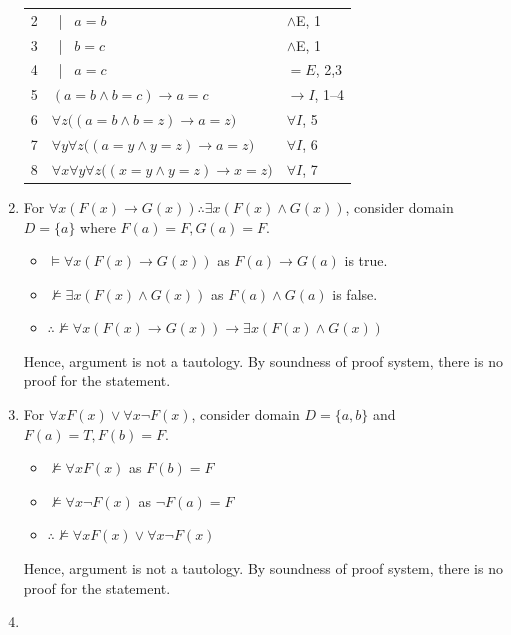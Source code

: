 \documentclass{article}
\newcommand{\asbar}{\ | \ }
\begin{document}
\begin{enumerate}
\begin{tabular}{l|p{8cm}l}
              2 & \asbar $a=b$                                                 & $\land$E, 1    \\
              3 & \asbar $b=c$                                                 & $\land$E, 1    \\
              4 & \asbar $a=c$                                                 & $=E$, 2,3      \\
              5 & $(a=b\land b=c)\to a=c$                                      & $\to I$, 1--4  \\
              6 & $\forall z\big((a=b\land b=z)\to a=z\big)$                   & $\forall I$, 5 \\
              7 & $\forall y\forall z\big((a=y\land y=z)\to a=z\big)$          & $\forall I$, 6 \\
              8 & $\forall x\forall y\forall z\big((x=y\land y=z)\to x=z\big)$ & $\forall I$, 7 \\
              \hline
          \end{tabular}
    \item For $\forall x\left(F(x)\to G(x)\right)\therefore \exists x\left(F(x)\land G(x)\right)$, consider domain $D=\{a\}$ where $F(a)=F, G(a)=F$.
          \begin{itemize}
              \item $\models \forall x\left(F(x)\to G(x)\right)$ as $F(a)\to G(a)$ is true.
              \item $\not\models \exists x\left(F(x)\land G(x)\right)$ as $F(a)\land G(a)$ is false.
              \item $\therefore \not\models \forall x\left(F(x)\to G(x)\right)\to \exists x\left(F(x)\land G(x)\right)$
          \end{itemize}
          Hence, argument is not a tautology. By soundness of proof system, there is no proof for the statement.

    \item For $\forall xF(x)\vee\forall x\neg F(x)$, consider domain $D=\{a,b\}$ and $F(a)=T, F(b)=F$.
          \begin{itemize}
              \item $\not\models \forall xF(x)$ as $F(b)=F$
              \item $\not\models \forall x\neg F(x)$ as $\neg F(a)=F$
              \item $\therefore \not\models \forall xF(x)\vee\forall x\neg F(x)$
          \end{itemize}
          Hence, argument is not a tautology. By soundness of proof system, there is no proof for the statement.
    \item \fbox{$\checkmark$}
\end{enumerate}
\end{document}
